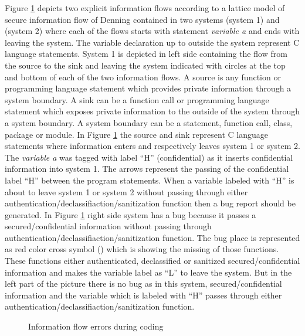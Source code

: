 Figure \ref{figure_bug_detection_during_coding} depicts two explicit information flows according to a lattice model of secure information flow of Denning \cite{ref_14_denning1976lattice} contained in two systems (system 1) and (system 2)
where each of the flows starts with statement \emph{variable a} and ends with leaving the system. The variable declaration up to outside the system represent C language statements. System 1 is depicted in left side containing the flow from the source to the sink and leaving the system indicated with circles at the top and bottom of each of the
two information flows. A source is any function or programming language statement which provides private information through a system boundary. A sink can be a function call or programming language statement which exposes private information to the outside of the system through a system boundary. A system boundary can be a statement, function call, class, package or module. In Figure \ref{figure_bug_detection_during_coding} the source and sink represent C language statements where information enters and respectively leaves system 1 or system 2. The \emph{ variable a} was tagged with label \enquote{H} (confidential) as it inserts confidential information into system 1. The arrows represent the passing of the confidential label \enquote{H} between the program statements. When a variable labeled with \enquote{H} is about to leave system 1 or system 2 without passing through either authentication/declassifiaction/sanitization function then a bug report should be generated. In Figure \ref{figure_bug_detection_during_coding} right side system has a bug because it passes a secured/confidential information without passing through authentication/declassifiaction/sanitization function. The bug place is represented as red color cross symbol () which is showing the missing of those functions. These functions either authenticated, declassified or sanitized  secured/confidential information and makes the variable label as \enquote{L} to leave the system. But in the left part of the picture there is no bug as in this system, secured/confidential information and the variable which is labeled with \enquote{H} passes through either authentication/declassifiaction/sanitization function.

\begin{figure}[htbp]
	\centering
	\caption{Information flow errors during coding}
	\label{figure_bug_detection_during_coding}
\end{figure}
